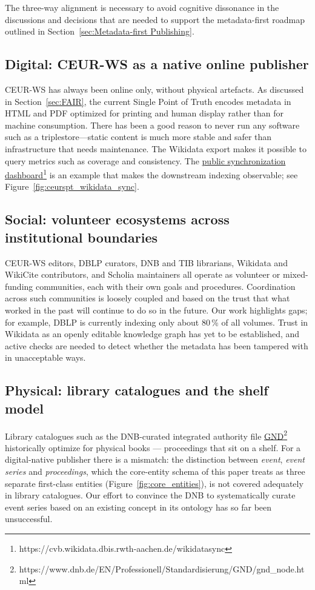\documentclass[runningheads]{llncs}
\newcommand{\footnotelink}[2]{\href{#1}{#2}\footnote{#1}}
\begin{document}
The three-way alignment is necessary to avoid cognitive dissonance in
the discussions and decisions that are needed to support the
metadata-first roadmap outlined in
Section~\ref{sec:Metadata-first Publishing}.

\subsection{Digital: CEUR-WS as a native online publisher}\label{sec:challenge_digital}
CEUR-WS has always been online only, without physical artefacts. As discussed in Section~\ref{sec:FAIR}, the current
Single Point of Truth encodes metadata in HTML and PDF optimized for
printing and human display rather than for machine consumption. There has been a good reason to never run any software such as a triplestore---static content is much more stable and safer than infrastructure that needs maintenance. The
Wikidata export makes it possible to query metrics such as
coverage and consistency. The \footnotelink{https://cvb.wikidata.dbis.rwth-aachen.de/wikidatasync}{public synchronization dashboard} is an
example that makes the downstream indexing observable; see Figure~\ref{fig:ceurspt_wikidata_sync}. 

\subsection{Social: volunteer ecosystems across institutional boundaries}\label{sec:challenge_social}
CEUR-WS editors, DBLP curators, DNB and TIB librarians, Wikidata and
WikiCite contributors, and Scholia maintainers all operate as volunteer
or mixed-funding communities, each with their own goals and procedures.
Coordination across such communities is loosely coupled and based on
the trust that what worked in the past will continue to do so in the
future. Our work highlights gaps; for example, DBLP is
currently indexing only about 80\,\% of all volumes.
Trust in Wikidata as an openly editable knowledge graph has yet to be established, and active checks are needed to detect whether the metadata has been tampered with in unacceptable ways.

\subsection{Physical: library catalogues and the shelf model}\label{sec:challenge_physical}
Library catalogues such as the DNB-curated integrated authority file \footnotelink{https://www.dnb.de/EN/Professionell/Standardisierung/GND/gnd\_node.html}{GND} historically optimize for physical
books --- proceedings that sit on a shelf. For a digital-native
publisher there is a mismatch: the distinction between \emph{event},
\emph{event series} and \emph{proceedings}, which the core-entity
schema of this paper treats as three separate first-class entities
(Figure~\ref{fig:core_entities}), is not covered adequately in library
catalogues. Our effort to convince the DNB to systematically curate
event series based on an existing concept in its ontology has so far
been unsuccessful.
\end{document}

